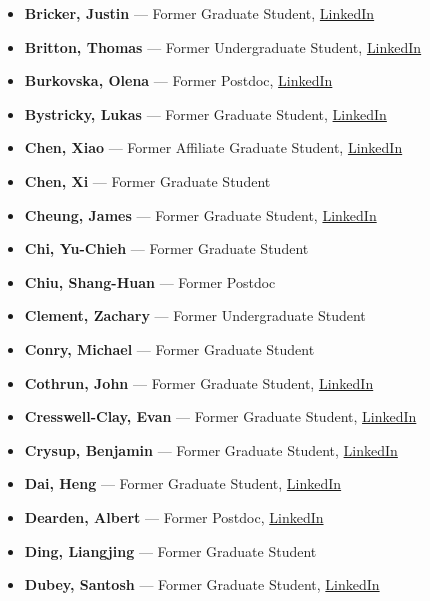 \documentclass[12pt,a4paper]{article}
\begin{document}
\begin{itemize}
    \item \textbf{Bricker, Justin} --- Former Graduate Student, \href{https://www.linkedin.com/in/justin-bricker-65022849/}{LinkedIn}
    \item \textbf{Britton, Thomas} --- Former Undergraduate Student, \href{https://www.linkedin.com/in/thomas-britton-iii-743120b4/}{LinkedIn}
    \item \textbf{Burkovska, Olena} --- Former Postdoc, \href{https://www.linkedin.com/in/olena-burkovska-01932598/}{LinkedIn}
    \item \textbf{Bystricky, Lukas} --- Former Graduate Student, \href{https://www.linkedin.com/in/lukas-bystricky-354a3297/}{LinkedIn}
    \item \textbf{Chen, Xiao} --- Former Affiliate Graduate Student, \href{https://www.linkedin.com/in/xiao-chen-63200a26/}{LinkedIn}
    \item \textbf{Chen, Xi} --- Former Graduate Student
    \item \textbf{Cheung, James} --- Former Graduate Student, \href{https://www.linkedin.com/in/james-cheung-02018890/}{LinkedIn}
    \item \textbf{Chi, Yu-Chieh} --- Former Graduate Student
    \item \textbf{Chiu, Shang-Huan} --- Former Postdoc
    \item \textbf{Clement, Zachary} --- Former Undergraduate Student
    \item \textbf{Conry, Michael} --- Former Graduate Student
    \item \textbf{Cothrun, John} --- Former Graduate Student, \href{https://www.linkedin.com/in/john-cothrun-b8b26588/}{LinkedIn}
    \item \textbf{Cresswell-Clay, Evan} --- Former Graduate Student, \href{https://www.linkedin.com/in/evan-cresswell-clay-557345100/}{LinkedIn}
    \item \textbf{Crysup, Benjamin} --- Former Graduate Student, \href{https://www.linkedin.com/in/benjamin-crysup-51630a109/}{LinkedIn}
    \item \textbf{Dai, Heng} --- Former Graduate Student, \href{https://www.linkedin.com/in/heng-dai-07450519/}{LinkedIn}
    \item \textbf{Dearden, Albert} --- Former Postdoc, \href{https://www.linkedin.com/in/albert-dearden-67057088/}{LinkedIn}
    \item \textbf{Ding, Liangjing} --- Former Graduate Student
    \item \textbf{Dubey, Santosh} --- Former Graduate Student, \href{https://www.linkedin.com/in/santosh-dubey-b333a5b/}{LinkedIn}

\end{itemize}
\end{document}
